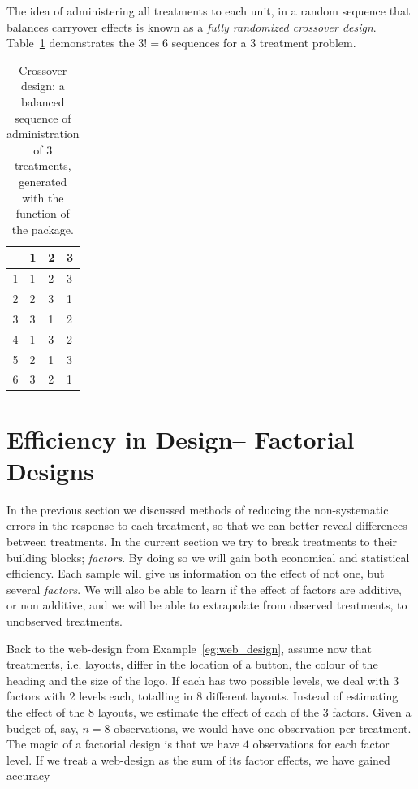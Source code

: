The idea of administering all treatments to each unit, in a random sequence that balances carryover effects is known as a \emph{fully randomized crossover design}. 
Table~\ref{tab:crossover} demonstrates the $3!=6$ sequences for a $3$ treatment problem.
\begin{table}[ht]
\centering
\begin{tabular}{rlll}
  \hline
 & 1 & 2 & 3 \\ 
  \hline
1 & 1 & 2 & 3 \\ 
  2 & 2 & 3 & 1 \\ 
  3 & 3 & 1 & 2 \\ 
  4 & 1 & 3 & 2 \\ 
  5 & 2 & 1 & 3 \\ 
  6 & 3 & 2 & 1 \\ 
   \hline
\end{tabular}
\caption[Crossover Design]{Crossover design: a balanced sequence of administration of $3$ treatments, generated with the  function of the  \R package. }
\label{tab:crossover}
\end{table}









\section{Efficiency in Design-- Factorial Designs}
\label{sec:factorial_design}

In the previous section we discussed methods of reducing the non-systematic errors in the response to each treatment, so that we can better reveal differences between treatments. 
In the current section we try to break treatments to their building blocks; \emph{factors}.
By doing so we will gain both economical and statistical efficiency. 
Each sample will give us information on the effect of not one, but several \emph{factors}.
We will also be able to learn if the effect of factors are additive, or non additive, and we will be able to extrapolate from observed treatments, to unobserved treatments. 


\begin{example}
\label{eg:web_design_II}
Back to the web-design from Example~\ref{eg:web_design}, assume now that treatments, i.e. layouts, differ in the location of a button, the colour of the heading and the size of the logo. 
If each has two possible levels, we deal with $3$ factors with $2$ levels each, totalling in $8$ different layouts. 
Instead of estimating the effect of the $8$ layouts, we estimate the effect of each of the $3$ factors. 
Given a budget of, say, $n=8$ observations, we would have one observation per treatment. 
The magic of a factorial design is that we have $4$ observations for each factor level.
If we treat a web-design as the sum of its factor effects, we have gained accuracy 
\end{example}

